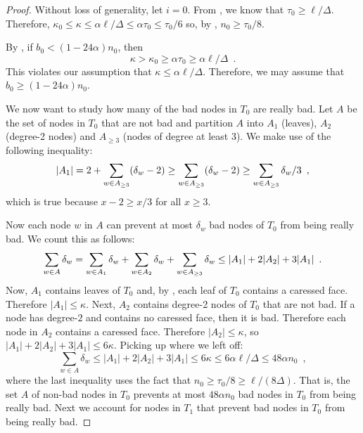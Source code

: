 \documentclass{patmorin}
\begin{document}
\begin{proof}
  Without loss of generality, let $i=0$. From , we know that $\tau_0\ge \ell/\Delta$.  Therefore, $\kappa_0\le\kappa\le \alpha\ell/\Delta \le \alpha\tau_0 \le \tau_0/6$ so, by , $n_0 \ge
  \tau_0/8$.

  By , if $b_0 < (1-24\alpha)n_0$, then
  \[
      \kappa > \kappa_0 \ge \alpha\tau_0
      \ge \alpha\ell/\Delta
      \enspace .
  \]
  This violates our assumption that $\kappa \le \alpha\ell/\Delta$.
  Therefore, we may assume that $b_0\ge (1-24\alpha)n_0$.

  We now want to study how many of the bad nodes in $T_0$ are really bad. Let $A$ be the set of nodes in $T_0$ that are not bad and partition $A$ into $A_1$ (leaves), $A_2$ (degree-2 nodes) and $A_{\ge 3}$ (nodes of degree at least 3).  We make use of the
  following inequality:
	\begin{equation}
		|A_1| = 2 + \sum_{w\in A_{\ge 3}}(\delta_w-2) \ge \sum_{w\in A_{\ge 3}}(\delta_w-2)
		\ge \sum_{w\in A_{\ge 3}}\delta_w/3 \enspace ,  \eqlabel{triple}
	\end{equation}
  which is true because $x-2\ge x/3$ for all $x\ge 3$.

  Now each node $w$ in $A$ can prevent at most $\delta_w$ bad nodes of $T_0$ from being really bad.  We count this as follows:
  \[
   \sum_{w\in A}\delta_w
     = \sum_{w\in A_1}\delta_w
         + \sum_{w\in A_2}\delta_w
         + \sum_{w\in A_{\ge 3}}\delta_w \\
	   \le |A_1| + 2|A_2| + 3|A_1| \enspace .
  \]
  Now, $A_1$ contains leaves of $T_0$ and, by , each leaf of $T_0$ contains a caressed face.  Therefore $|A_1|\le\kappa$.
  Next, $A_2$ contains degree-2 nodes of $T_0$ that are not bad.  If a node has degree-$2$ and contains no caressed face, then it is bad. Therefore each node in $A_2$ contains a caressed face. Therefore $|A_2|\le \kappa$, so $|A_1|+2|A_2|+3|A_1| \le 6\kappa$.  Picking up where we left off:
  \[
      \sum_{w\in A}\delta_w \le |A_1|+2|A_2|+3|A_1|
       \le 6\kappa
     \le 6\alpha\ell/\Delta \le 48\alpha n_0 \enspace ,
  \]
  where the last inequality uses the fact that $n_0 \ge
  \tau_0/8 \ge \ell/(8\Delta)$.
  That is, the set $A$ of non-bad nodes in $T_0$ prevents at most $48\alpha n_0$ bad nodes in $T_0$ from being really bad.  Next we account
  for nodes in $T_1$ that prevent bad nodes in $T_0$ from being really bad.


\end{proof}
\end{document}
